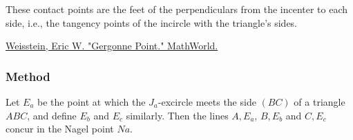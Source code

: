 \medskip
\noindent
These contact points are the feet of the perpendiculars from the incenter to each side, i.e., the tangency points of the incircle with the triangle’s sides.

\begin{flushright}
\small
\href{https://mathworld.wolfram.com/GergonnePoint.html}{Weisstein, Eric W. "Gergonne Point." MathWorld.}
\end{flushright}

\vspace{1em}

\begin{minipage}{.5\textwidth}
\begin{center}
\end{center}
\end{minipage}
\begin{minipage}{.5\textwidth}
\begin{tkzexample}
\end{tkzexample}
\end{minipage}


\subsubsection{Method } %
\label{ssub:method_triangle_nagel__point}

Let $E_a$ be the point at which the $J_a$-excircle meets the side $(BC)$ of a triangle $ABC$, and define $E_b$ and $E_c$ similarly. Then the lines $A,E_a$, $B,E_b$ and $C,E_c$ concur in the Nagel point  $Na$.

